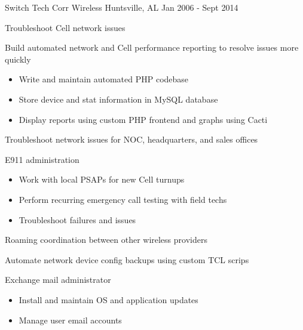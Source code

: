 \begin{cventries}
  \cventry
    {Switch Tech} %
    {Corr Wireless} %
    {Huntsville, AL} %
    {Jan 2006 - Sept 2014} %
    {
      \begin{cvitems} %
        \item {Troubleshoot Cell network issues}
        \item {Build automated network and Cell performance reporting to resolve issues more quickly}
            \begin{itemize}
                \item {Write and maintain automated PHP codebase}
                \item {Store device and stat information in MySQL database}
                \item {Display reports using custom PHP frontend and graphs using Cacti}
            \end{itemize}
        \item {Troubleshoot network issues for NOC, headquarters, and sales offices}
        \item {E911 administration}
            \begin{itemize}
                \item {Work with local PSAPs for new Cell turnups}
                \item {Perform recurring emergency call testing with field techs}
                \item {Troubleshoot failures and issues}
            \end{itemize}
        \item {Roaming coordination between other wireless providers}
        \item {Automate network device config backups using custom TCL scrips}
        \item {Exchange mail administrator}
            \begin{itemize}
                \item {Install and maintain OS and application updates}
                \item {Manage user email accounts}
            \end{itemize}
      \end{cvitems}
    }

\end{cventries}
